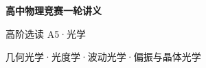 \documentclass[UTF8,zihao=-4,oneside,openany]{ctexbook}
\begin{document}
\frontmatter
\begin{titlepage}
 \centering\vspace*{.25\textheight}
 {\Huge\bfseries 高中物理竞赛一轮讲义\par}\vspace{1.2em}
 {\Large 高阶选读 A5·光学\par}\vspace{.8em}
 \vfill
 {\color{TextGray}几何光学·光度学·波动光学·偏振与晶体光学\par}
\end{titlepage}
\tableofcontents
\mainmatter

\end{document}

